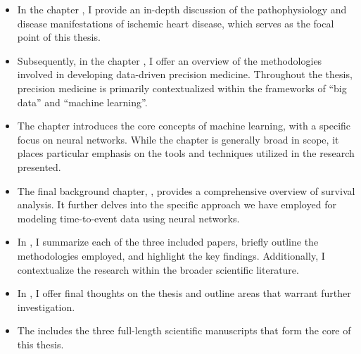 \begin{itemize} 

    \item In the chapter , I provide an
        in-depth discussion of the pathophysiology and disease manifestations of
        ischemic heart disease, which serves as the focal point of this thesis.

    \item Subsequently, in the chapter , I offer an
        overview of the methodologies involved in developing data-driven
        precision medicine. Throughout the thesis, precision medicine is
        primarily contextualized within the frameworks of \enquote{big data} 
        and \enquote{machine learning}.

    \item The chapter  introduces the core concepts of
        machine learning, with a specific focus on neural networks. While the
        chapter is generally broad in scope, it places particular emphasis on
        the tools and techniques utilized in the research presented.

    \item The final background chapter, , provides a
        comprehensive overview of survival analysis. It further delves into the
        specific approach we have employed for modeling time-to-event data
        using neural networks.  

    \item In , I summarize each of the three included papers,
        briefly outline the methodologies employed, and highlight the key
        findings.  Additionally, I contextualize the research within the
        broader scientific literature.

    \item In , I offer final thoughts on the thesis and
        outline areas that warrant further investigation.

    \item The  includes the three full-length scientific
        manuscripts that form the core of this thesis.

\end{itemize}

